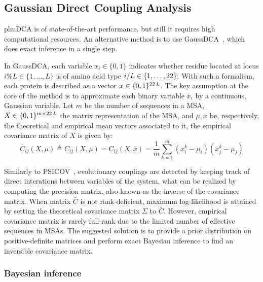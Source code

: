     \subsection{Gaussian Direct Coupling Analysis}

        plmDCA is of state-of-the-art performance, but still it requires high computational resources.
        An alternative method is to use GaussDCA~\cite{10.1371/journal.pone.0092721}, which does
        exact inference in a single step.

        In GaussDCA, each variable $x_i \in \{0, 1\}$ indicates whether residue located at locus $i \% L \in \{ 1, \dotsc, L \}$
        is of amino acid type $i / L \in \{1, \dotsc, 22\}$. With such a formalism, each protein is described as a vector
        $x \in \{0, 1\}^{22\,L}$. The key assumption at the core of the method is to approximate each binary variable $x_i$
        by a continuous, Gaussian variable. Let $m$ be the number of sequences in a MSA, $X \in \{0, 1\}^{m \times 22\,L}$
        the matrix representation of the MSA, and $\mu, \bar{x}$ be, respectively, the theoretical and empirical mean vectors associated to it,
        the empirical covariance matrix of $X$ is given by:
        \begin{equation}
            \bar{C}_{ij}(X, \mu) \triangleq C_{ij}(X, \mu) = C_{ij}(X, \bar{x}) = \frac{1}{m} \sum\limits_{k=1}^m (x_i^k - \mu_i) (x_j^k - \mu_j)
        \end{equation}

        Similarly to PSICOV~\cite{doi:10.1093/bioinformatics/btr638}, evolutionary couplings are detected by keeping track of direct interations
        between variables of the system, what can be realized by computing the precision matrix, also known as the inverse of the covariance matrix.
        When matrix $\bar{C}$ is not rank-deficient, maximum log-likelihood is attained by setting the theoretical covariance matrix
        $\Sigma$ to $\bar{C}$. However, empirical covariance matrix is rarely full-rank due to the limited number of effective sequences
        in MSAs. The suggested solution is to provide a prior distribution on positive-definite matrices and perform exact Bayesian inference
        to find an inversible covariance matrix.

        \subsubsection{Bayesian inference}

